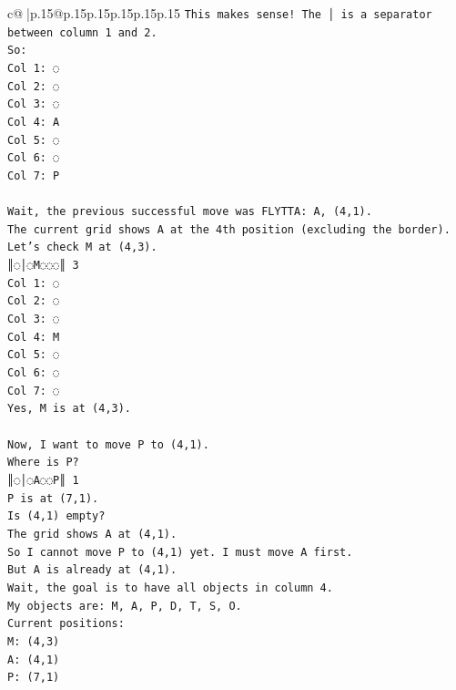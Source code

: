 \documentclass{article}
\begin{document}
{\begin{supertabular}{c@{$\;$}|p{.15\linewidth}@{}p{.15\linewidth}p{.15\linewidth}p{.15\linewidth}p{.15\linewidth}p{.15\linewidth}}
{{{\texttt{This makes sense! The │ is a separator between column 1 and 2.} \\
\texttt{So:} \\
\texttt{Col 1: ◌} \\
\texttt{Col 2: ◌} \\
\texttt{Col 3: ◌} \\
\texttt{Col 4: A} \\
\texttt{Col 5: ◌} \\
\texttt{Col 6: ◌} \\
\texttt{Col 7: P} \\
\\ 
\texttt{Wait, the previous successful move was FLYTTA: A, (4,1).} \\
\texttt{The current grid shows A at the 4th position (excluding the border).} \\
\texttt{Let's check M at (4,3).} \\
\texttt{║◌│◌M◌◌◌║ 3} \\
\texttt{Col 1: ◌} \\
\texttt{Col 2: ◌} \\
\texttt{Col 3: ◌} \\
\texttt{Col 4: M} \\
\texttt{Col 5: ◌} \\
\texttt{Col 6: ◌} \\
\texttt{Col 7: ◌} \\
\texttt{Yes, M is at (4,3).} \\
\\ 
\texttt{Now, I want to move P to (4,1).} \\
\texttt{Where is P?} \\
\texttt{║◌│◌A◌◌P║ 1} \\
\texttt{P is at (7,1).} \\
\texttt{Is (4,1) empty?} \\
\texttt{The grid shows A at (4,1).} \\
\texttt{So I cannot move P to (4,1) yet. I must move A first.} \\
\texttt{But A is already at (4,1).} \\
\texttt{Wait, the goal is to have all objects in column 4.} \\
\texttt{My objects are: M, A, P, D, T, S, O.} \\
\texttt{Current positions:} \\
\texttt{M: (4,3)} \\
\texttt{A: (4,1)} \\
\texttt{P: (7,1)} \\
}}}
\end{supertabular}}
\end{document}
